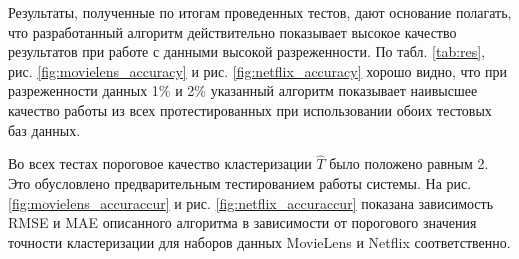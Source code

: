 \documentclass[a4paper, 12pt]{article} %
\begin{document}
	\par
	
	Результаты, полученные по итогам проведенных тестов, дают основание полагать, что разработанный алгоритм действительно показывает высокое качество результатов при работе с данными высокой разреженности. По табл. \ref{tab:res}, рис. \ref{fig:movielens_accuracy} и рис. \ref{fig:netflix_accuracy} хорошо видно, что при разреженности данных 1\% и 2\% указанный алгоритм показывает наивысшее качество работы из всех протестированных при использовании обоих тестовых баз данных.
	
	\par
	Во всех тестах пороговое качество кластеризации $\hat{T}$ было положено равным 2. Это обусловлено предварительным тестированием работы системы. На рис. \ref{fig:movielens_accuraccur} и рис. \ref{fig:netflix_accuraccur} показана зависимость RMSE и MAE описанного алгоритма в зависимости от порогового значения точности кластеризации для наборов данных MovieLens и Netflix соответственно.
	
\end{document}
